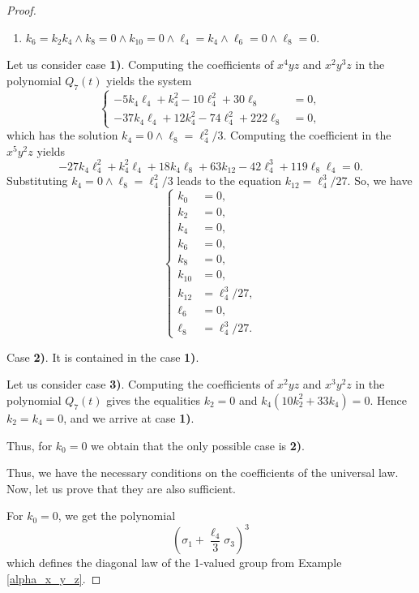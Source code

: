 \documentclass[14pt, dvipsnames]{extarticle}
\theoremstyle{definition}
\theoremstyle{definition}
\theoremstyle{remark}
\begin{document}
\begin{proof}
\begin{enumerate}[\bf 1)]
\item $k_6=k_2 k_4\land k_8=0\land k_{10}=0\land \ell_4=k_4\land \ell_6=0\land \ell_8=0$.

\end{enumerate}

Let us consider case {\bf 1)}. Computing the coefficients of $x^4yz$ and $x^2y^3z$ in the polynomial $Q_7(t)$ yields the system
$$\begin{cases}
-5k_{4}\ell_{4}+k_{4}^{2}-10\ell_{4}^{2}+30\ell_{8} & =0,\\
-37k_{4}\ell_{4}+12k_{4}^{2}-74\ell_{4}^{2}+222\ell_{8} & =0,
\end{cases}$$
which has the solution $k_4=0\land \ell_8=\ell_4^2/3$. Computing the coefficient in the $x^5y^2z$ yields $$-27 k_4 \ell_4^2+k_4^2 \ell_4+18 k_4 \ell_8+63 k_{12}-42 \ell_4^3+119 \ell_8 \ell_4 = 0.$$ Substituting $k_4=0\land \ell_8=\ell_4^2/3$ leads to the equation $k_{12} = \ell_4^3/27$. So, we have \begin{equation*}\left\{\begin{aligned}\label{c_case}k_0 &= 0,\\ k_2 &= 0,\\ k_4 &= 0,\\ k_6 &= 0,\\ k_8 &= 0,\\ k_{10} &= 0,\\ k_{12} &= \ell_4^3/27,\\  \ell_6 &= 0,\\ \ell_8 &= \ell_4^3/27. \end{aligned}\right.\end{equation*}    

Case {\bf 2)}. It is contained in the case {\bf 1)}.

Let us consider case {\bf 3)}. Computing the coefficients of $x^2yz$ and $x^3y^2z$ in the polynomial $Q_7(t)$ gives the equalities $k_2 = 0$ and $k_4(10 k_2^2+33 k_4) = 0$. Hence $k_2 = k_4 = 0$, and we arrive at case {\bf 1)}.

Thus, for $k_0 = 0$ we obtain that the only possible case is {\bf 2)}.

Thus, we have the necessary conditions on the coefficients of the universal law. Now, let us prove that they are also sufficient.

For $k_0 = 0$, we get the polynomial $$\left(\sigma_1 + \frac{\ell_4}{3}\sigma_3\right)^3$$ which defines the diagonal law of the 1-valued group from Example \ref{alpha_x_y_z}.


\end{proof}
\end{document}

